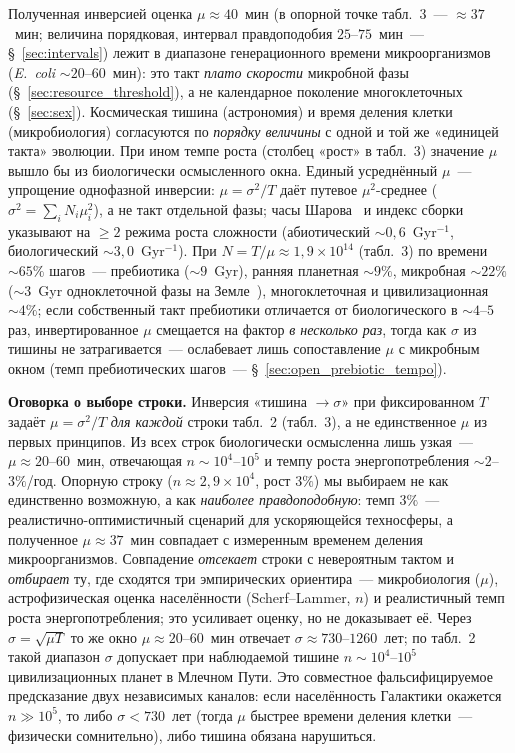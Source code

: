 \documentclass[12pt,a4paper]{article}
\begin{document}
Полученная инверсией оценка $\mu \approx 40$~мин (в опорной точке табл.~3~--- $\approx 37$~мин; величина порядковая, интервал правдоподобия $25$--$75$~мин~--- \S~\ref{sec:intervals}) лежит в диапазоне генерационного времени микроорганизмов (\emph{E.~coli} $\sim 20$--$60$~мин): это такт \emph{плато скорости} микробной фазы (\S~\ref{sec:resource_threshold}), а не календарное поколение многоклеточных (\S~\ref{sec:sex}). Космическая тишина (астрономия) и время деления клетки (микробиология) согласуются по \emph{порядку величины} с одной и той же «единицей такта» эволюции. При ином темпе роста (столбец «рост» в табл.~3) значение $\mu$ вышло бы из биологически осмысленного окна. Единый усреднённый $\mu$~--- упрощение однофазной инверсии: $\mu=\sigma^2/T$ даёт путевое $\mu^2$-среднее ($\sigma^2=\sum_i N_i\mu_i^2$), а не такт отдельной фазы; часы Шарова~\cite{Sharov2013} и индекс сборки~\cite{Marshall2021,Cronin2023} указывают на $\geq 2$ режима роста сложности (абиотический $\sim 0{,}6$~Gyr$^{-1}$, биологический $\sim 3{,}0$~Gyr$^{-1}$). При $N = T/\mu \approx 1{,}9\times10^{14}$ (табл.~3) по времени $\sim 65\%$ шагов~--- пребиотика ($\sim 9$~Gyr), ранняя планетная $\sim 9\%$, микробная $\sim 22\%$ ($\sim 3$~Gyr одноклеточной фазы на Земле~\cite{Nutman2016}), многоклеточная и цивилизационная $\sim 4\%$; если собственный такт пребиотики отличается от биологического в $\sim 4$--$5$ раз, инвертированное $\mu$ смещается на фактор \emph{в несколько раз}, тогда как $\sigma$ из тишины не затрагивается~--- ослабевает лишь сопоставление $\mu$ с микробным окном (темп пребиотических шагов~--- \S~\ref{sec:open_prebiotic_tempo}).

\textbf{Оговорка о выборе строки.} Инверсия «тишина $\to \sigma$» при фиксированном $T$ задаёт $\mu=\sigma^2/T$ \emph{для каждой} строки табл.~2 (табл.~3), а не единственное $\mu$ из первых принципов. Из всех строк биологически осмысленна лишь узкая~--- $\mu \approx 20$--$60$~мин, отвечающая $n \sim 10^4$--$10^5$ и темпу роста энергопотребления $\sim 2$--$3\%$/год. Опорную строку ($n \approx 2{,}9\times10^4$, рост $3\%$) мы выбираем не как единственно возможную, а как \emph{наиболее правдоподобную}: темп $3\%$~--- реалистично-оптимистичный сценарий для ускоряющейся техносферы, а полученное $\mu \approx 37$~мин совпадает с измеренным временем деления микроорганизмов. Совпадение \emph{отсекает} строки с невероятным тактом и \emph{отбирает} ту, где сходятся три эмпирических ориентира~--- микробиология ($\mu$), астрофизическая оценка населённости (Scherf--Lammer, $n$) и реалистичный темп роста энергопотребления; это усиливает оценку, но не доказывает её. Через $\sigma = \sqrt{\mu T}$ то же окно $\mu \approx 20$--$60$~мин отвечает $\sigma \approx 730$--$1260$~лет; по табл.~2 такой диапазон $\sigma$ допускает при наблюдаемой тишине $n \sim 10^4$--$10^5$ цивилизационных планет в Млечном Пути. Это совместное фальсифицируемое предсказание двух независимых каналов: если населённость Галактики окажется $n \gg 10^5$, то либо $\sigma < 730$~лет (тогда $\mu$ быстрее времени деления клетки~--- физически сомнительно), либо тишина обязана нарушиться.
\end{document}
